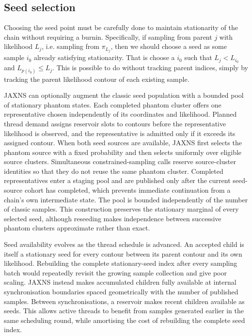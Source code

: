 \documentclass[pdflatex,sn-basic,icol]{sn-jnl}
\theoremstyle{plain}
\theoremstyle{definition}
\begin{document}
\subsection{Seed selection}

Choosing the seed point must be carefully done to maintain stationarity of the chain without requiring a burnin.
Specifically, if sampling from parent $j$ with likelihood $L_j$, i.e. sampling from $\pi_{L_j}$, then we should choose a seed as some sample $i_0$ already satisfying stationarity.
That is choose a $i_0$ such that $L_j < L_{i_0}$ and $L_{p(i_0)} \le L_j$.
This is possible to do without tracking parent indices, simply by tracking the parent likelihood contour of each existing sample.

JAXNS can optionally augment the classic seed population with a bounded pool of stationary phantom states.
Each completed phantom cluster offers one representative chosen independently of its coordinates and likelihood.
Planned thread demand assigns reservoir slots to contours before the representative likelihood is observed, and the representative is admitted only if it exceeds its assigned contour.
When both seed sources are available, JAXNS first selects the phantom source with a fixed probability and then selects uniformly over eligible source clusters.
Simultaneous constrained-sampling calls reserve source-cluster identities so that they do not reuse the same phantom cluster.
Completed representatives enter a staging pool and are published only after the current seed-source cohort has completed, which prevents immediate continuation from a chain's own intermediate state.
The pool is bounded independently of the number of classic samples.
This construction preserves the stationary marginal of every selected seed, although reseeding makes independence between successive phantom clusters approximate rather than exact.

Seed availability evolves as the thread schedule is advanced.
An accepted child is itself a stationary seed for every contour between its parent contour and its own likelihood.
Rebuilding the complete stationary-seed index after every sampling batch would repeatedly revisit the growing sample collection and give poor scaling.
JAXNS instead makes accumulated children fully available at internal synchronisation boundaries spaced geometrically with the number of published samples.
Between synchronisations, a reservoir makes recent children available as seeds.
This allows active threads to benefit from samples generated earlier in the same scheduling round, while amortising the cost of rebuilding the complete seed index.
\end{document}
